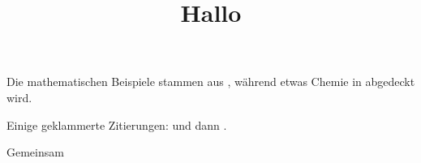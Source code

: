 \documentclass{article}
\title{Hallo}
\begin{document}
Die mathematischen Beispiele stammen aus \citet{Graham1995}, während etwas
Chemie in \citet{Thomas2008} abgedeckt wird.

Einige geklammerte Zitierungen: \citep{Graham1995} und dann
\citep[S.~56]{Thomas2008}.

\citep[Siehe][Seiten~45--48]{Graham1995}

Gemeinsam \citep{Graham1995,Thomas2008}



\end{document}
